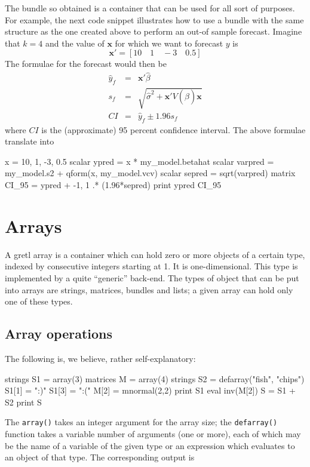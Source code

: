 The bundle so obtained is a container that can be used for all sort of
purposes. For example, the next code snippet illustrates how to use
a bundle with the same structure as the one created above to perform
an out-of sample forecast. Imagine that $k=4$ and the value of
$\mathbf{x}$ for which we want to forecast $y$ is
\[
  \mathbf{x}' = [ 10 \quad 1  \quad -3 \quad 0.5 ]
\]
The formulae for the forecast would then be
\begin{eqnarray*}
  \hat{y}_f & = & \mathbf{x}'\hat{\beta} \\
  s_f & = & \sqrt{\hat{\sigma}^2 + \mathbf{x}'V(\hat{\beta})\mathbf{x}} \\
  CI & = & \hat{y}_f \pm 1.96 s_f 
\end{eqnarray*}
where $CI$ is the (approximate) 95 percent confidence interval. The
above formulae translate into
\begin{code}
  x = { 10, 1, -3, 0.5 }
  scalar ypred    = x * my_model.betahat
  scalar varpred  = my_model.s2 + qform(x, my_model.vcv)
  scalar sepred   = sqrt(varpred)
  matrix CI_95    = ypred + {-1, 1} .* (1.96*sepred)
  print ypred CI_95
\end{code}

\section{Arrays}
\label{sec:arrays}

A gretl array is a container which can hold zero or more objects of a
certain type, indexed by consecutive integers starting at 1. It is
one-dimensional. This type is implemented by a quite ``generic''
back-end. The types of object that can be put into arrays are strings,
matrices, bundles and lists; a given array can hold only one of these
types.

\subsection{Array operations}

The following is, we believe, rather self-explanatory:

\begin{code}
strings S1 = array(3)
matrices M = array(4)
strings S2 = defarray("fish", "chips")
S1[1] = ":)"
S1[3] = ":("
M[2] = mnormal(2,2)
print S1
eval inv(M[2])
S = S1 + S2
print S
\end{code}

The \texttt{array()} takes an integer argument for the array size; the
\texttt{defarray()} function takes a variable number of arguments (one
or more), each of which may be the name of a variable of the given
type or an expression which evaluates to an object of that type.  The
corresponding output is

